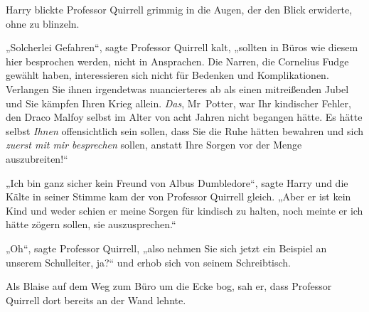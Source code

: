 Harry blickte Professor Quirrell grimmig in die Augen, der den Blick erwiderte, ohne zu blinzeln.

„Solcherlei Gefahren“, sagte Professor Quirrell kalt, „sollten in Büros wie diesem hier besprochen werden, nicht in Ansprachen. Die Narren, die Cornelius Fudge gewählt haben, interessieren sich nicht für Bedenken und Komplikationen. Verlangen Sie ihnen irgendetwas nuancierteres ab als einen mitreißenden Jubel und Sie kämpfen Ihren Krieg allein. \emph{Das}, Mr~Potter, war Ihr kindischer Fehler, den Draco Malfoy selbst im Alter von acht Jahren nicht begangen hätte. Es hätte selbst \emph{Ihnen} offensichtlich sein sollen, dass Sie die Ruhe hätten bewahren und sich \emph{zuerst mit mir besprechen} sollen, anstatt Ihre Sorgen vor der Menge auszubreiten!“

„Ich bin ganz sicher kein Freund von Albus Dumbledore“, sagte Harry und die Kälte in seiner Stimme kam der von Professor Quirrell gleich. „Aber er ist kein Kind und weder schien er meine Sorgen für kindisch zu halten, noch meinte er ich hätte zögern sollen, sie auszusprechen.“

„Oh“, sagte Professor Quirrell, „also nehmen Sie sich jetzt ein Beispiel an unserem Schulleiter, ja?“ und erhob sich von seinem Schreibtisch.

\later

Als Blaise auf dem Weg zum Büro um die Ecke bog, sah er, dass Professor Quirrell dort bereits an der Wand lehnte.

